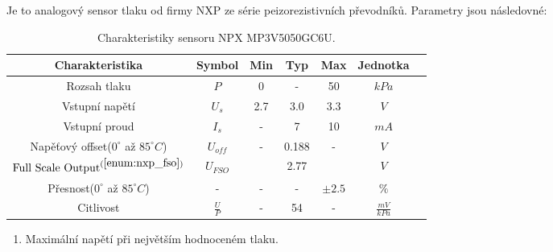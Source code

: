 Je to analogový sensor tlaku od firmy NXP ze série peizorezistivních převodníků. Parametry jsou následovné:
\begin{table}[H]
    \label{tab:nxp_properties}
    \caption{Charakteristiky sensoru NPX MP3V5050GC6U. \cite{cite:NXP}}
    \begin{ctucolortab}
        \begin{tabular}{ccccccc}
            \toprule
            Charakteristika                                         & Symbol        & Min & Typ   & Max        & Jednotka         & \\ \midrule
            Rozsah tlaku                                            & $P$           & 0   & -     & 50         & $kPa$            & \\
            Vstupní napětí                                          & $U_{s}$       & 2.7 & 3.0   & 3.3        & $V$              & \\
            Vstupní proud                                           & $I_{s}$       & -   & 7     & 10         & $mA$             & \\
            Napěťový offset($0^{\circ}$ až $ 85^{\circ}  C $)       & $U_{off}$     & -   & 0.188 & -          & $V$              & \\
            $\textnormal{Full Scale Output}^{(\ref{enum:nxp_fso})}$ & $U_{FSO}$     &     & 2.77  &            & $V$              & \\
            Přesnost($0^{\circ}$ až $ 85^{\circ} C$)                & -             & -   & -     & $\pm 2.5 $ & $\%$             & \\
            Citlivost                                               & $\frac{U}{P}$ & -   & 54    & -          & $\frac{mV}{kPa}$ & \\
            \bottomrule
        \end{tabular}
    \end{ctucolortab}

    \begin{enumerate}
        \item \label{enum:nxp_fso} Maximální napětí při největším hodnoceném tlaku.
    \end{enumerate}
\end{table}

